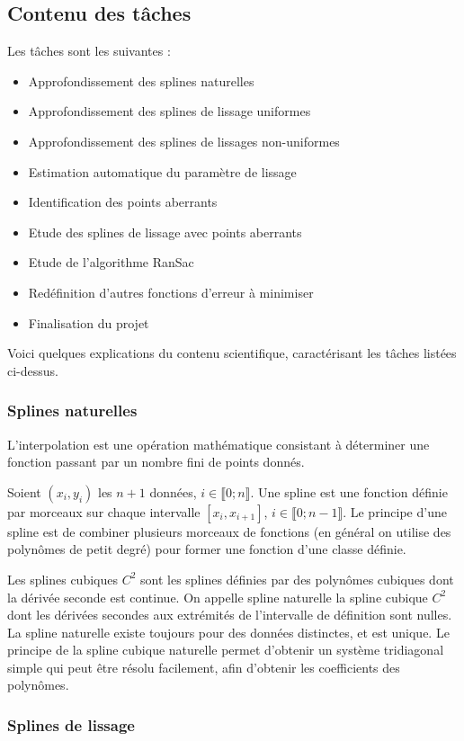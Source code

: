 \documentclass[a4paper,10pt]{article} %
\begin{document}
	\subsection{Contenu des tâches}
	Les tâches sont les suivantes :
\begin{itemize}
\item Approfondissement des splines naturelles
\item Approfondissement des splines de lissage uniformes
\item Approfondissement des splines de lissages non-uniformes
\item Estimation automatique du paramètre de lissage
\item Identification des points aberrants
\item Etude des splines de lissage avec points aberrants
\item Etude de l'algorithme RanSac
\item Redéfinition d'autres fonctions d'erreur à minimiser
\item Finalisation du projet
\end{itemize}

Voici quelques explications du contenu scientifique, caractérisant les tâches listées ci-dessus.
\subsubsection*{Splines naturelles}
L’interpolation est une opération mathématique consistant à déterminer une fonction passant par un nombre fini de points donnés.

Soient $(x_i,y_i)$ les $n+1$ données, $i\in\llbracket 0; n \rrbracket$.
Une spline est une fonction définie par morceaux sur chaque intervalle $[x_i, x_{i+1}]$, $i\in\llbracket 0; n-1 \rrbracket$.
Le principe d'une spline est de combiner plusieurs morceaux de fonctions (en général on utilise des polynômes de petit degré) pour former une fonction d'une classe définie.

Les splines cubiques $C^2$ sont les splines définies par des polynômes cubiques dont la dérivée seconde est continue. On appelle spline naturelle la spline cubique $C^2$ dont les dérivées secondes aux extrémités de l'intervalle de définition sont nulles. La spline naturelle existe toujours pour des données distinctes, et est unique. Le principe de la spline cubique naturelle permet d'obtenir un système tridiagonal simple qui peut être résolu facilement, afin d'obtenir les coefficients des polynômes.

\subsubsection*{Splines de lissage}
\end{document}
